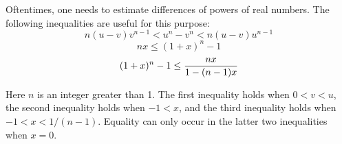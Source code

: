 \documentclass[12pt]{article}
\begin{document}
Oftentimes, one needs to estimate differences of powers of real numbers.
The following inequalities are useful for this purpose:
\[ n (u-v) v^{n-1} < u^n - v^n < n (u-v) u^{n-1} \]
\[ n x \le (1 + x)^n - 1 \]
\[ (1 + x)^n - 1 \le { n x \over 1 - (n - 1) x} \]

Here $n$ is an integer greater than 1.
The first inequality holds when $0 < v < u$, the second inequality holds
when $-1 < x $, and the third inequality holds when $-1 < x < 1/(n-1)$.
Equality can only occur in the latter two inequalities when $x = 0$.
\end{document}
